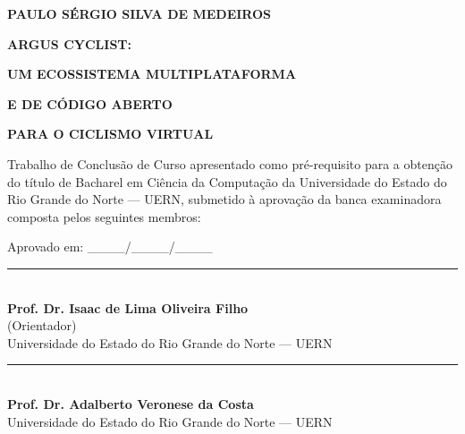 
\begin{center}
  \textbf{\large PAULO SÉRGIO SILVA DE MEDEIROS}
  \vspace{1.2cm}
  \par
  \textbf{\Large ARGUS CYCLIST:}
  \par
  \textbf{\Large UM ECOSSISTEMA MULTIPLATAFORMA}
  \par
  \textbf{\Large E DE CÓDIGO ABERTO}
  \par
  \textbf{\Large PARA O CICLISMO VIRTUAL}
  \vspace{0.6cm}
  \par
  \hfill
  \begin{minipage}{0.52\textwidth}
    \small
    Trabalho de Conclusão de Curso apresentado como pré-requisito para a
    obtenção do título de Bacharel em Ciência da Computação da Universidade
    do Estado do Rio Grande do Norte --- UERN, submetido à aprovação da banca
    examinadora composta pelos seguintes membros:
  \end{minipage}
  \vspace{0.5cm}
  \par
  Aprovado em: \_\_\_\_/\_\_\_\_/\_\_\_\_
\end{center}

\vspace{2.3cm}

\noindent
\begin{minipage}[t]{0.48\textwidth}
  \centering
  \rule{6.4cm}{0.4pt}\\[0.15cm]
  \textbf{Prof. Dr. Isaac de Lima Oliveira Filho}\\
  (Orientador)\\
  Universidade do Estado do Rio Grande do Norte --- UERN
\vspace{2.5cm}
\end{minipage}\hfill
\begin{minipage}[t]{0.48\textwidth}
  \centering
  \rule{6.4cm}{0.4pt}\\[0.15cm]
  \textbf{Prof. Dr. Adalberto Veronese da Costa}\\
  Universidade do Estado do Rio Grande do Norte --- UERN
\vspace{2.5cm}
\end{minipage}


